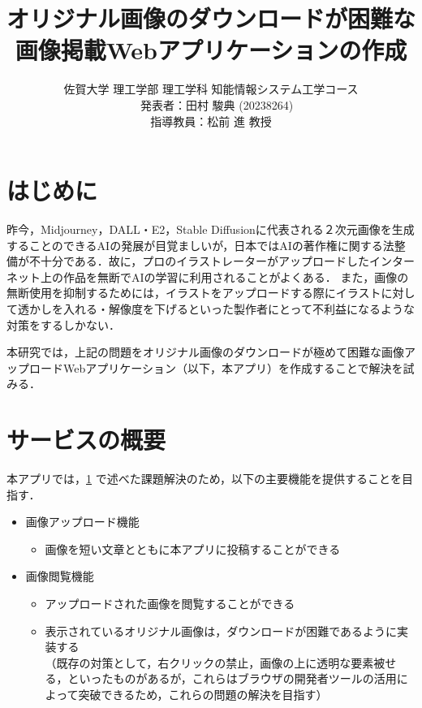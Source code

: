 ﻿\documentclass[twocolumn,a4j]{jarticle}
\title{
  オリジナル画像のダウンロードが困難な\\画像掲載Webアプリケーションの作成
}
\author{
  佐賀大学 理工学部 理工学科 知能情報システム工学コース\\
  　発表者：田村 駿典 (20238264)\\
  指導教員：松前 進 教授
}
\begin{document}
\date{\empty}
\maketitle
\thispagestyle{empty}

\section{はじめに}\label{sec:sec1}

昨今，Midjourney，DALL・E2，Stable Diffusionに代表される２次元画像を生成することのできるAIの発展が目覚ましいが，日本ではAIの著作権に関する法整備が不十分である．故に，プロのイラストレーターがアップロードしたインターネット上の作品を無断でAIの学習に利用されることがよくある\cite{nhk}．
また，画像の無断使用を抑制するためには，イラストをアップロードする際にイラストに対して透かしを入れる・解像度を下げるといった製作者にとって不利益になるような対策をするしかない．\par
本研究では，上記の問題をオリジナル画像のダウンロードが極めて困難な画像アップロードWebアプリケーション（以下，本アプリ）を作成することで解決を試みる．



\section{サービスの概要}
本アプリでは，\ref{sec:sec1} で述べた課題解決のため，以下の主要機能を提供することを目指す．
\begin{itemize}
  \item 画像アップロード機能
        \setlength{\parskip}{0cm}
        \begin{itemize}
          \item 画像を短い文章とともに本アプリに投稿することができる
        \end{itemize}
  \item 画像閲覧機能
        \begin{itemize}
          \item アップロードされた画像を閲覧することができる
          \item 表示されているオリジナル画像は，ダウンロードが困難であるように実装する\\（既存の対策として，右クリックの禁止，画像の上に透明な要素被せる，といったものがあるが，これらはブラウザの開発者ツールの活用によって突破できるため，これらの問題の解決を目指す）
        \end{itemize}
\end{itemize}
\end{document}
